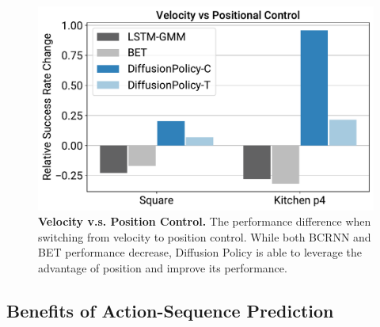 
 
\begin{figure}[h]
\centering
\includegraphics[width=0.85\linewidth]{figure/pos_vs_vel_figure.pdf}
\caption{\textbf{Velocity v.s. Position Control.} \label{fig:pos_vs_vel} The performance difference when switching from velocity to position control. While both BCRNN and BET performance decrease, Diffusion Policy is able to leverage the advantage of position and improve its performance. }
\vspace{-4mm}
\end{figure}



\subsection{Benefits of Action-Sequence Prediction}
\label{sec:action_sequence}


